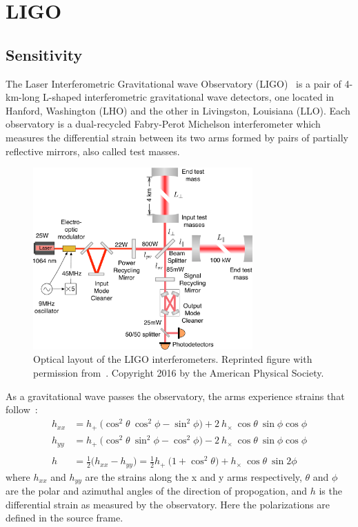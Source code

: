 \documentclass [12pt, proquest]{uwthesis}[2019]
\begin{document}
\section{LIGO}

\subsection{Sensitivity}

The Laser Interferometric Gravitational wave Observatory (LIGO)~\cite{aLIGO} is a pair of 4-km-long L-shaped interferometric gravitational wave detectors, one located in Hanford, Washington (LHO) and the other in Livingston, Louisiana (LLO). Each observatory is a dual-recycled Fabry-Perot Michelson interferometer which measures the differential strain between its two arms formed by pairs of partially reflective mirrors, also called test masses. 
\begin{figure}[!h]
\begin{center}
\includegraphics[width=0.75\textwidth]{LIGO_Schematic.pdf}
\caption[Optical layout of the LIGO interferometers]{Optical layout of the LIGO interferometers. Reprinted figure with permission from~\cite{LIGOSens}. Copyright 2016 by the American Physical Society.}
\label{LIGO_Schematic}
\end{center}
\end{figure}

\pagebreak
As a gravitational wave passes the observatory, the arms experience strains that follow~\cite{GWBook}:
\begin{align}
h_{xx}&=h_+\ \big( \cos^2\theta\ \cos^2\phi-\sin^2\phi \big)+2\ h_\times\ \cos \theta\ \sin \phi \cos \phi \\
h_{yy}&=h_+\ \big( \cos^2\theta\ \sin^2\phi-\cos^2\phi \big)-2\ h_\times\ \cos \theta\ \sin \phi \cos \phi \\
\nonumber \\
h&=\frac{1}{2} \big( h_{xx}-h_{yy} \big)=\frac{1}{2}h_+\ \big( 1+\cos^2\theta \big)+ h_\times\ \cos \theta\ \sin 2 \phi 
\end{align}
where $h_{xx}$ and $h_{yy}$ are the strains along the x and y arms respectively, $\theta$ and $\phi$ are the polar and azimuthal angles of the direction of propogation, and $h$ is the differential strain as measured by the observatory. Here the polarizations are defined in the source frame.
\end{document}
